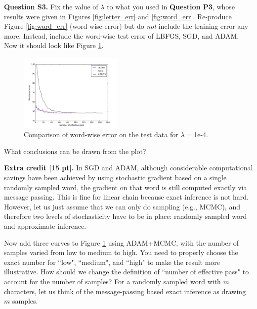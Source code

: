 \documentclass[11pt]{report}
\begin{document}
{\bf Question S3.}
Fix the value of $\lambda$ to what you used in {\bf Question P3},
whose results were given in Figures \ref{fig:letter_err} and \ref{fig:word_err}.
Re-produce Figure \ref{fig:word_err} (word-wise error) but do \emph{not} include the training error any more.
Instead, include the word-wise test error of LBFGS, SGD, and ADAM.
Now it should look like Figure \ref{fig:compare_word_err}.

\begin{figure}[t]
\centering
\includegraphics[width=5cm]{s3}
\caption{Comparison of word-wise error on the test data for $\lambda=$1e-4.}
\label{fig:compare_word_err}
\end{figure}


What conclusions can be drawn from the plot?

{\bf Extra credit [15 pt].} 
In SGD and ADAM, although considerable computational savings have been achieved by using stochastic gradient based on a single randomly sampled word,
the gradient on that word is still computed exactly via message passing.
This is fine for linear chain because exact inference is not hard.
However, let us just assume that we can only do sampling (e.g., MCMC),
and therefore two levels of stochasticity have to be in place: 
randomly sampled word and approximate inference.

Now add three curves to Figure \ref{fig:compare_word_err} using ADAM+MCMC,
with the number of samples varied from low to medium to high.
You need to properly choose the exact number for ``low", ``medium", and ``high" to make the result more illustrative.
How should we change the definition of ``number of effective pass" to account for the number of samples?
For a randomly sampled word with $m$ characters, 
let us think of the message-passing based exact inference as drawing $m$ samples.
\end{document}
